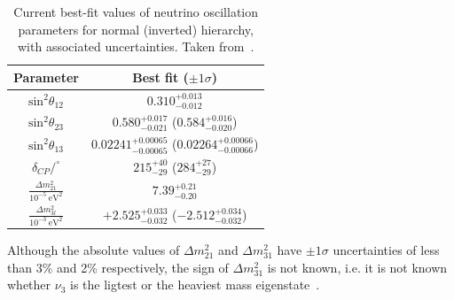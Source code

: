 \begin{table}
  \caption{Current best-fit values of neutrino oscillation parameters for normal (inverted) hierarchy, with associated uncertainties. Taken from~\cite{nufit4}.}
  \label{tab:nufit4}
  \centering
  \begin{tabular}{c c}
    \hline
    Parameter & Best fit ($\pm1\sigma$) \\
    \hline
    $\text{sin}^{2}\theta_{12}$ & $0.310^{+0.013}_{-0.012}$ \\[.2cm]
    $\text{sin}^{2}\theta_{23}$ & $0.580^{+0.017}_{-0.021}$ ($0.584^{+0.016}_{-0.020}$) \\[.2cm]
    $\text{sin}^{2}\theta_{13}$ & $0.02241^{+0.00065}_{-0.00065}$ ($0.02264^{+0.00066}_{-0.00066}$) \\[.2cm]
    $\delta_{CP}/^{\circ}$ & $215^{+40}_{-29}$ ($284^{+27}_{-29}$) \\[.2cm]
    \hline
    $\frac{\Delta m^{2}_{21}}{10^{-5}~\text{eV}^{2}}$ & $7.39^{+0.21}_{-0.20}$\\[.2cm]
    $\frac{\Delta m^{2}_{3l}}{10^{-3}~\text{eV}^{2}}$ & $+2.525^{+0.033}_{-0.032}$ ($-2.512^{+0.034}_{-0.032}$) \\[.2cm]
    \hline
  \end{tabular}
\end{table}

Although the absolute values of $\Delta m^{2}_{21}$ and $\Delta m^{2}_{31}$ have $\pm1\sigma$ uncertainties of less than 3\% and 2\% respectively, the sign of $\Delta m^{2}_{31}$ is not known, i.e. it is not known whether $\nu_{3}$ is the ligtest or the heaviest mass eigenstate~\cite{nufit4}.

